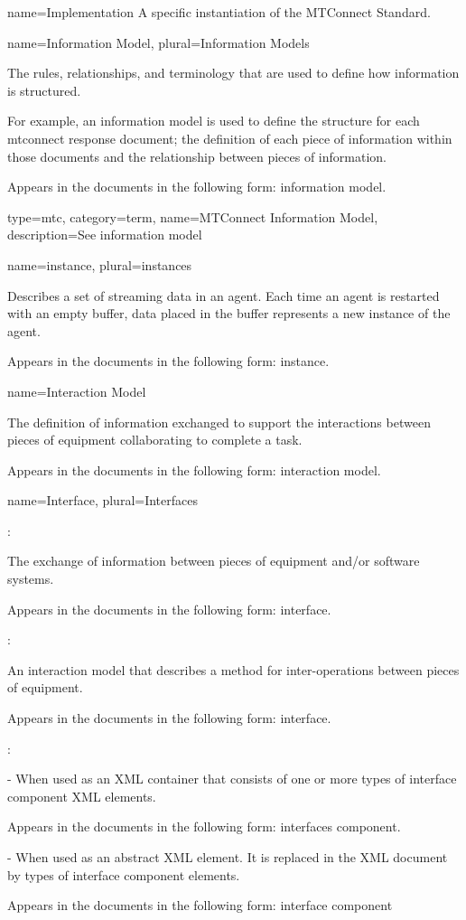 {
  name={Implementation}
}
{
	A specific instantiation of the MTConnect Standard.
}


{
  name={Information Model},
  plural={Information Models}
}
{
	The rules, relationships, and terminology that are used to define how information is structured.

	For example, an information model is used to define the structure for each \gls{mtconnect response document}; the definition of each piece of information within those documents and the relationship between pieces of information.

	Appears in the documents in the following form: \gls{information model}.
}

{
  type=mtc,
  category=term,
  name={MTConnect Information Model},
  description={See \gls{information model}}
}

{
  name={instance},
  plural={instances}
}
{
	Describes a set of \gls{streaming data} in an \gls{agent}.  Each time an \gls{agent} is restarted with an empty \gls{buffer}, data placed in the \gls{buffer} represents a new \gls{instance} of the \gls{agent}.

	Appears in the documents in the following form: \gls{instance}.
}


{
  name={Interaction Model}
}
{
	The definition of information exchanged to support the interactions between pieces of equipment collaborating to complete a task.

	Appears in the documents in the following form: \gls{interaction model}.
}


{
  name={Interface},
  plural={Interfaces}
}
{
	:

	The exchange of information between pieces of equipment and/or software systems.

	Appears in the documents in the following form: interface.

	:

	An \gls{interaction model} that describes a method for inter-operations between pieces of equipment.

	Appears in the documents in the following form: \gls{interface}.

	:

	\tab - When used as an XML container that consists of one or more types of \gls{interface component} XML elements.

	Appears in the documents in the following form: \gls{interfaces component}.

	\tab - When used as an abstract XML element.  It is replaced in the XML document by types of \gls{interface component} elements.

	Appears in the documents in the following form: \gls{interface component}
}


